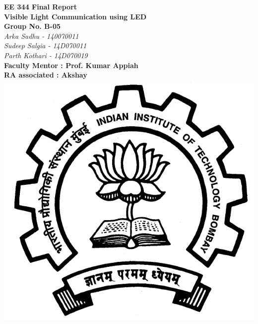 \documentclass{article}
\begin{document}
\begin{titlepage}
   \begin{center}
     \Large\textbf{EE 344 Final Report \\Visible Light Communication using LED}\\
     \vspace{3cm}
     \large \textbf{Group No. B-05}\\
     \large\textit{Arka Sadhu - 140070011\\Sudeep Salgia - 14D070011\\Parth Kothari - 14D070019\\}
     \vspace{3cm}
     \large\textbf{Faculty Mentor : Prof. Kumar Appiah}\\
     \large\textbf{RA associated : Akshay}\\
     \vspace{5cm}
     \includegraphics[scale=0.15]{images/iitblogo}
   \end{center}
\end{titlepage}

\newpage
\end{document}
